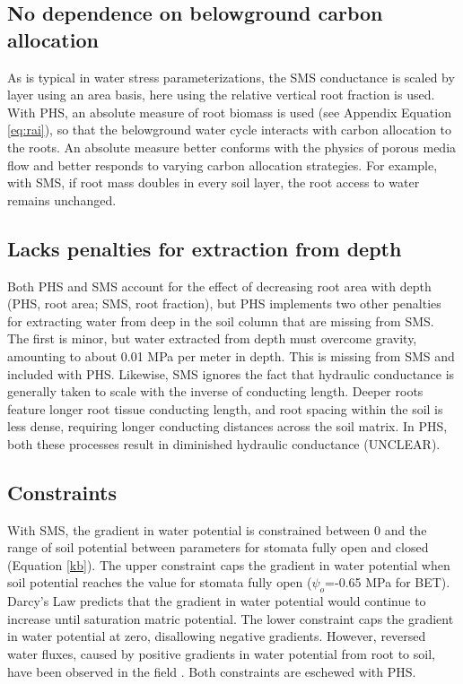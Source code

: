 \documentclass[draft,linenumbers]{agujournal}
\begin{document}
    \subsection{No dependence on belowground carbon allocation}
    As is typical in water stress parameterizations, the SMS conductance is scaled by layer using an area basis, here using the relative vertical root fraction is used.
    With PHS, an absolute measure of root biomass is used (see Appendix Equation \ref{eq:rai}), so that the belowground water cycle interacts with carbon allocation to the roots.
    An absolute measure better conforms with the physics of porous media flow and better responds to varying carbon allocation strategies.
    For example, with SMS, if root mass doubles in every soil layer, the root access to water remains unchanged.

    \subsection{Lacks penalties for extraction from depth}
    Both PHS and SMS account for the effect of decreasing root area with depth (PHS, root area; SMS, root fraction), but
    PHS implements two other penalties for extracting water from deep in the soil column that are missing from SMS.
    The first is minor, but water extracted from depth must overcome gravity, amounting to about 0.01 MPa per meter in depth. 
    This is missing from SMS and included with PHS. 
    Likewise, SMS ignores the fact that hydraulic conductance is generally taken to scale with the inverse of conducting length.
    Deeper roots feature longer root tissue conducting length, and root spacing within the soil is less dense, requiring longer conducting distances across the soil matrix.
    In PHS, both these processes result in diminished hydraulic conductance (UNCLEAR).

    \subsection{Constraints}
    With SMS, the gradient in water potential is constrained between 0 and 
    the range of soil potential between parameters for stomata fully open and closed (Equation \ref{kb}). 
    The upper constraint caps the gradient in water potential when soil potential reaches the value for stomata fully open ($\psi_o$=-0.65 MPa for BET).
    Darcy's Law predicts that the gradient in water potential would continue to increase until saturation matric potential.
    The lower constraint caps the gradient in water potential at zero, disallowing negative gradients.
    However, reversed water fluxes, caused by positive gradients in water potential from root to soil, have been observed in the field \citep{burgess1998}.
    Both constraints are eschewed with PHS.     
\end{document}
